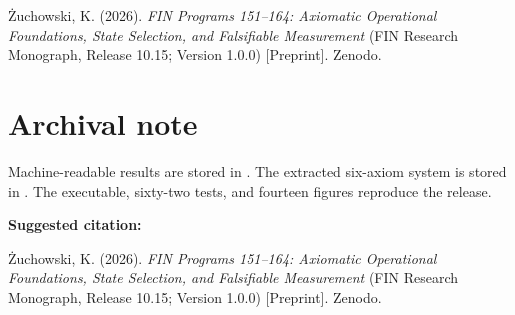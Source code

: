 \documentclass[11pt,a4paper,openany]{report}
\begin{document}
\.Zuchowski, K. (2026). \emph{FIN Programs 151--164: Axiomatic Operational Foundations, State Selection, and Falsifiable Measurement} (FIN Research Monograph, Release 10.15; Version 1.0.0) [Preprint]. Zenodo.


\clearpage
\chapter*{Archival note}
Machine-readable results are stored in
.
The extracted six-axiom system is stored in
.
The executable, sixty-two tests, and fourteen figures reproduce the release.

\medskip
\noindent\textbf{Suggested citation:}

\.Zuchowski, K. (2026). \emph{FIN Programs 151--164: Axiomatic Operational
Foundations, State Selection, and Falsifiable Measurement}
(FIN Research Monograph, Release 10.15; Version 1.0.0) [Preprint]. Zenodo.
\end{document}
